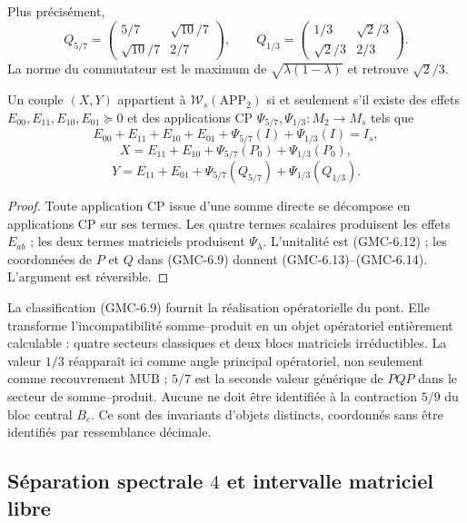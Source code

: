 Plus précisément,
\[
 Q_{5/7}=
 \begin{pmatrix}5/7&\sqrt{10}/7\\\sqrt{10}/7&2/7\end{pmatrix},
 \qquad
 Q_{1/3}=
 \begin{pmatrix}1/3&\sqrt2/3\\\sqrt2/3&2/3\end{pmatrix}.
 \tag{GMC-6.11}
\]
La norme du commutateur est le maximum de
$\sqrt{\lambda(1-\lambda)}$ et retrouve $\sqrt2/3$.

\begin{corollary}
\label{p12-83-c22-s1:gmc:cor:rango-app-d2}
Un couple $(X,Y)$ appartient à $\mathcal W_s(\mathrm{APP}_2)$ si et seulement s'il
existe des effets
$E_{00},E_{11},E_{10},E_{01}\succeq0$ et des applications CP
$\Psi_{5/7},\Psi_{1/3}:M_2\to M_s$ tels que
\[
 E_{00}+E_{11}+E_{10}+E_{01}
 +\Psi_{5/7}(I)+\Psi_{1/3}(I)=I_s,
 \tag{GMC-6.12}
\]
\[
 X=E_{11}+E_{10}
 +\Psi_{5/7}(P_0)+\Psi_{1/3}(P_0),
 \tag{GMC-6.13}
\]
\[
 Y=E_{11}+E_{01}
 +\Psi_{5/7}(Q_{5/7})+\Psi_{1/3}(Q_{1/3}).
 \tag{GMC-6.14}
\]
\end{corollary}

\begin{proof}
Toute application CP issue d'une somme directe se décompose en applications CP sur ses
termes. Les quatre termes scalaires produisent les effets $E_{ab}$ ; les
deux termes matriciels produisent $\Psi_\lambda$. L'unitalité est
\textup{(GMC-6.12)} ; les coordonnées de $P$ et $Q$ dans \textup{(GMC-6.9)} donnent
\textup{(GMC-6.13)}--\textup{(GMC-6.14)}. L'argument est réversible.
\end{proof}

\begin{bridgebox}
La classification \textup{(GMC-6.9)} fournit la réalisation opératorielle du pont. Elle transforme
l'incompatibilité somme--produit en un objet opératoriel entièrement
calculable : quatre secteurs classiques et deux blocs matriciels irréductibles.
La valeur $1/3$ réapparaît ici comme angle principal opératoriel, non seulement comme
recouvrement MUB ; $5/7$ est la seconde valeur générique de $PQP$ dans le secteur de
somme--produit. Aucune ne doit être identifiée à la contraction $5/9$ du bloc
central $B_c$. Ce sont des invariants d'objets distincts, coordonnés sans
être identifiés par ressemblance décimale.
\end{bridgebox}

\subsection{Séparation spectrale \texorpdfstring{$4$}{4} et intervalle matriciel libre}

